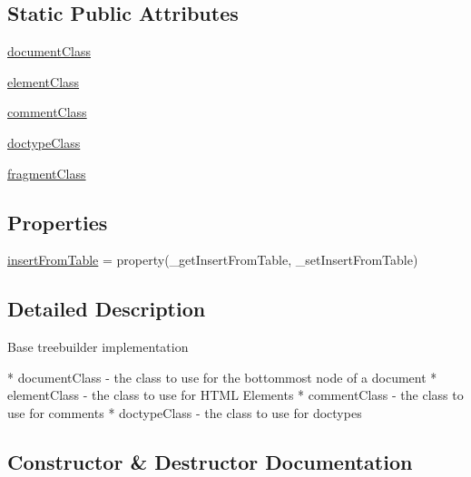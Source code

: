 \subsection*{Static Public Attributes}
\begin{DoxyCompactItemize}
\item 
\hyperlink{classpip_1_1__vendor_1_1html5lib_1_1treebuilders_1_1base_1_1TreeBuilder_aa53db9c4764208fbc0e5a5cb741e30c9}{document\+Class}
\item 
\hyperlink{classpip_1_1__vendor_1_1html5lib_1_1treebuilders_1_1base_1_1TreeBuilder_a6a392f97359b940f0492e66f543d7996}{element\+Class}
\item 
\hyperlink{classpip_1_1__vendor_1_1html5lib_1_1treebuilders_1_1base_1_1TreeBuilder_aa3bfc3a8794985a652c81460428bf6ab}{comment\+Class}
\item 
\hyperlink{classpip_1_1__vendor_1_1html5lib_1_1treebuilders_1_1base_1_1TreeBuilder_a794b039a39e83fe382791f1d9385935e}{doctype\+Class}
\item 
\hyperlink{classpip_1_1__vendor_1_1html5lib_1_1treebuilders_1_1base_1_1TreeBuilder_a64c81dadefea903772b241c6f2315cab}{fragment\+Class}
\end{DoxyCompactItemize}
\subsection*{Properties}
\begin{DoxyCompactItemize}
\item 
\hyperlink{classpip_1_1__vendor_1_1html5lib_1_1treebuilders_1_1base_1_1TreeBuilder_a4f0b2c2648925235fe71994be918039d}{insert\+From\+Table} = property(\+\_\+get\+Insert\+From\+Table, \+\_\+set\+Insert\+From\+Table)
\end{DoxyCompactItemize}


\subsection{Detailed Description}
\begin{DoxyVerb}Base treebuilder implementation

* documentClass - the class to use for the bottommost node of a document
* elementClass - the class to use for HTML Elements
* commentClass - the class to use for comments
* doctypeClass - the class to use for doctypes\end{DoxyVerb}
 

\subsection{Constructor \& Destructor Documentation}
\mbox{\label{classpip_1_1__vendor_1_1html5lib_1_1treebuilders_1_1base_1_1TreeBuilder_a9c33de062da5ed869465f126e6d4c88c}} 
